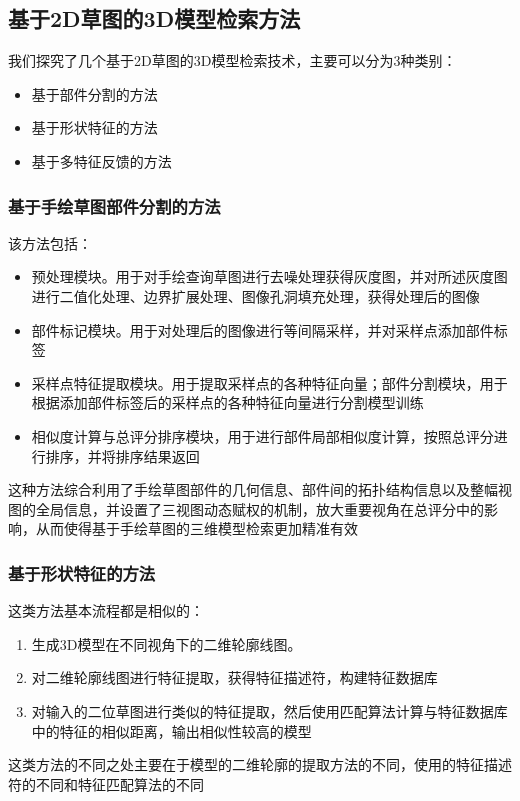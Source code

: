 \documentclass{article}
\begin{document}
\subsection{基于2D草图的3D模型检索方法}
我们探究了几个基于2D草图的3D模型检索技术，主要可以分为3种类别：
\begin{itemize}
    \item 基于部件分割的方法
    \item 基于形状特征的方法
    \item 基于多特征反馈的方法
\end{itemize}
\subsubsection{基于手绘草图部件分割的方法}
该方法包括：
\begin{itemize}
    \item 预处理模块。用于对手绘查询草图进行去噪处理获得灰度图，并对所述灰度图进行二值化处理、边界扩展处理、图像孔洞填充处理，获得处理后的图像
    \item 部件标记模块。用于对处理后的图像进行等间隔采样，并对采样点添加部件标签
    \item 采样点特征提取模块。用于提取采样点的各种特征向量；部件分割模块，用于根据添加部件标签后的采样点的各种特征向量进行分割模型训练
    \item 相似度计算与总评分排序模块，用于进行部件局部相似度计算，按照总评分进行排序，并将排序结果返回
\end{itemize}

这种方法综合利用了手绘草图部件的几何信息、部件间的拓扑结构信息以及整幅视图的全局信息，并设置了三视图动态赋权的机制，放大重要视角在总评分中的影响，从而使得基于手绘草图的三维模型检索更加精准有效
\subsubsection{基于形状特征的方法}
这类方法基本流程都是相似的：
\begin{enumerate}
    \item 生成3D模型在不同视角下的二维轮廓线图。
    \item 对二维轮廓线图进行特征提取，获得特征描述符，构建特征数据库
    \item 对输入的二位草图进行类似的特征提取，然后使用匹配算法计算与特征数据库中的特征的相似距离，输出相似性较高的模型
\end{enumerate}
   
这类方法的不同之处主要在于模型的二维轮廓的提取方法的不同，使用的特征描述符的不同和特征匹配算法的不同
\end{document}
